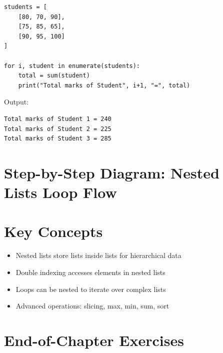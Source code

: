 \begin{verbatim}
students = [
    [80, 70, 90],
    [75, 85, 65],
    [90, 95, 100]
]

for i, student in enumerate(students):
    total = sum(student)
    print("Total marks of Student", i+1, "=", total)
\end{verbatim}

Output:

\begin{verbatim}
Total marks of Student 1 = 240
Total marks of Student 2 = 225
Total marks of Student 3 = 285
\end{verbatim}

\section{Step-by-Step Diagram: Nested Lists Loop Flow}

\begin{center}
\end{center}

\section{Key Concepts}

\begin{itemize}
    \item Nested lists store lists inside lists for hierarchical data  
    \item Double indexing accesses elements in nested lists  
    \item Loops can be nested to iterate over complex lists  
    \item Advanced operations: slicing, max, min, sum, sort  
\end{itemize}

\section{End-of-Chapter Exercises}


